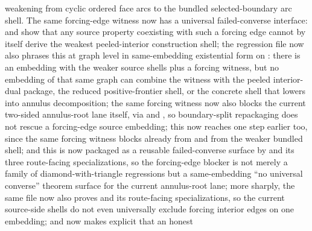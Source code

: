 \documentclass[11pt]{article}
\begin{document}
\begin{itemize}
weakening from cyclic ordered face arcs to the bundled selected-boundary arc
shell.  The same forcing-edge witness now has a universal failed-converse
interface:
and
show that any source property coexisting with such a forcing edge cannot by
itself derive the weakest peeled-interior construction shell; the regression
file now also phrases this at graph level in same-embedding
existential form on : there is an embedding with
the weaker source shells plus a forcing witness, but no embedding of that same
graph can combine the witness with the peeled interior-dual package, the
reduced positive-frontier shell, or the concrete
 shell that lowers into
annulus decomposition; the same forcing witness now also blocks the current
two-sided annulus-root lane itself, via
and
,
so boundary-split repackaging does not rescue a forcing-edge source embedding;
this now reaches one step earlier too, since the same forcing witness blocks
 already from
 and from the weaker bundled
 shell; and this is now
packaged as a reusable failed-converse surface by
and its three route-facing specializations, so the forcing-edge blocker is not
merely a family of diamond-with-triangle regressions but a same-embedding
``no universal converse'' theorem surface for the current annulus-root lane;
more sharply, the same file now also proves
and its route-facing specializations, so the current source-side shells do not
even universally exclude forcing interior edges on one embedding; and
 now makes explicit that an honest

\end{itemize}
\end{document}
